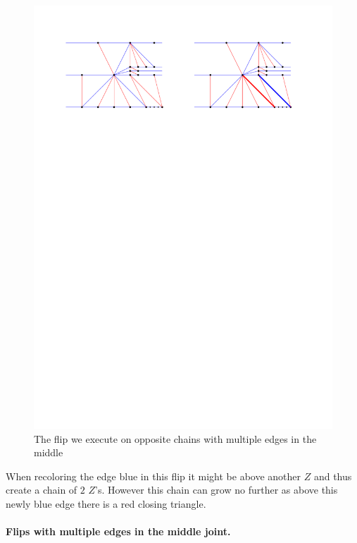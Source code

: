   \begin{figure}[h]
    \centering
    \includegraphics[width = \textwidth]{unifiedAlgo/img/post/oppMultiFlip}
    \caption{The flip we execute on opposite chains with multiple edges in the middle}
    \label{fig:uni:oppMultiFlip}
  \end{figure}

  When recoloring the edge blue in this flip it might be above another $Z$ and thus create a chain of $2$ $Z$'s. However this chain can grow no further as above this newly blue edge there is a red closing triangle.



  \paragraph{Flips with multiple edges in the middle joint.}


